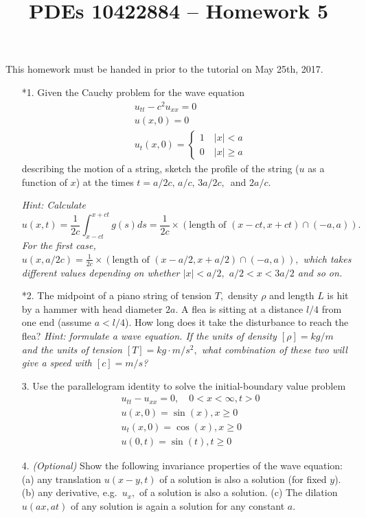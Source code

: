 \documentclass[10pt,a4paper]{article}
\title{PDEs 10422884 – Homework 5}
\date{}
\begin{document}
\maketitle


This homework must be handed in prior to the tutorial on May 25th,
2017. 
\begin{enumerate}
\item[*1.] Given the Cauchy problem for the wave equation
\begin{align*}
& u_{tt} - c^2 u_{xx} = 0\\
& u(x,0) = 0\\
& u_t(x,0) = \begin{cases} 1 \quad |x| < a\\
0 \quad |x| \geq a \end{cases}
\end{align*}
describing the motion of a string, sketch the profile of the string ($u$ as a function of $x$) at the times $t = a/2c, \, a/c, \, 3a/2c, \,$ and $2a/c.$ %

\emph{Hint: Calculate}
\[ u(x,t) = \frac{1}{2c} \int_{x-ct}^{x+ct} g(s) ds = \frac{1}{2c} \times ( \text{length of } (x-ct,x+ct) \cap (-a,a) ). \]
\emph{For the first case, $u(x,a/2c) = \frac{1}{2c} \times ( \text{length of } (x-a/2,x+a/2) \cap (-a,a) ),$ which takes different values depending on whether $|x|<a/2,$ $a/2 < x < 3a/2$ and so on.}

\item[*2.] The midpoint of a piano string of tension $T,$ density $\rho$ and length $L$ is hit by a hammer with head diameter $2a.$ A flea is sitting at a distance $l/4$ from one end (assume $a < l/4$). How long does it take the disturbance to reach the flea? 
\emph{Hint: formulate a wave equation. If the units of density $[\rho] = kg/m$ and the units of tension $[T] = kg \cdot m/s^2,$ what combination of these two will give a speed with $[c] = m/s$?} %

\item[3.] Use the parallelogram identity to solve the initial-boundary value problem
\begin{align*}
& u_{tt} - u_{xx} = 0, \quad 0 < x <\infty, t>0 \\
& u(x,0) = \sin(x), x \geq 0\\
& u_t(x,0) = \cos(x), x \geq 0\\
&u(0,t) = \sin(t), t \geq 0
\end{align*}

\item[4.] \emph{(Optional)} Show the following invariance properties of the wave equation: (a) any translation $u(x-y,t)$ of a solution is also a solution (for fixed $y$). (b) any derivative, e.g.\ $u_x,$ of a solution is also a solution. (c) The dilation $u(ax,at)$ of any solution is again a solution for any constant $a.$
\end{enumerate}
\end{document}
